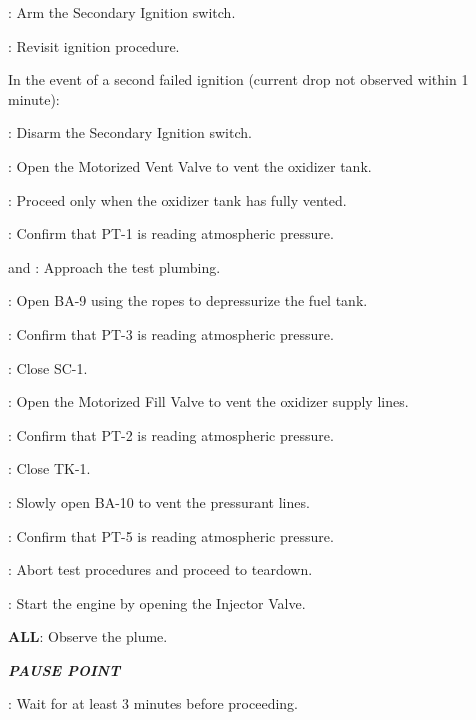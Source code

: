 \begin{checklist}
\begin{checklist}
\begin{checklist}[label=$\bullet$]
\begin{checklist}
                \item \control{}: Arm the Secondary Ignition switch.
                \item \ops{}: Revisit ignition procedure.
            \end{checklist}
            \item In the event of a second failed ignition (current drop not observed within 1 minute):
            \begin{checklist}
                \item \control{}: Disarm the Secondary Ignition switch.
                \item \control{}: Open the Motorized Vent Valve to vent the oxidizer tank.
                \item \ops{}: Proceed only when the oxidizer tank has fully vented.
				\item \daq{}: Confirm that PT-1 is reading atmospheric pressure.
                \item \primary{} and \secondary{}: Approach the test plumbing.
                \item \primary{}: Open BA-9 using the ropes to depressurize the fuel tank.
                \item \daq{}: Confirm that PT-3 is reading atmospheric pressure.
                \item \primary{}: Close SC-1.
                \item \control{}: Open the Motorized Fill Valve to vent the oxidizer supply lines.
                \item \daq{}: Confirm that PT-2 is reading atmospheric pressure.
				\item \primary{}: Close TK-1.
	            \item \primary{}: Slowly open BA-10 to vent the pressurant lines.
                \item \daq{}: Confirm that PT-5 is reading atmospheric pressure.
                \item \ops{}: Abort test procedures and proceed to teardown.
            \end{checklist}
        \end{checklist}
        \item \control{}: Start the engine by opening the Injector Valve.
    \end{checklist}
    \item \textbf{ALL}: Observe the plume.
    \item \textbf{\textit{PAUSE POINT}}
    \item \ops{}: Wait for at least 3 minutes before proceeding.

\end{checklist}
